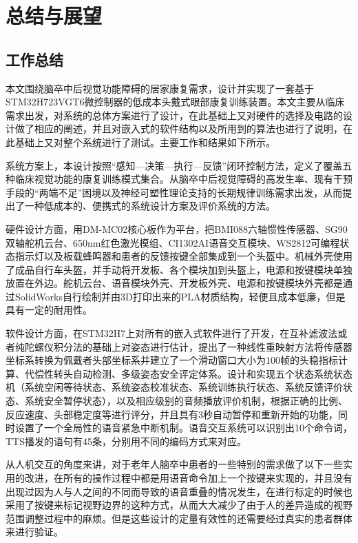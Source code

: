\chapter{总结与展望}

\section{工作总结}

本文围绕脑卒中后视觉功能障碍的居家康复需求，设计并实现了一套基于STM32H723VGT6微控制器的低成本头戴式眼部康复训练装置。本文主要从临床需求出发，对系统的总体方案进行了设计，在此基础上又对硬件的选择及电路的设计做了相应的阐述，并且对嵌入式的软件结构以及所用到的算法也进行了说明，在此基础上又对整个系统进行了测试。主要工作和结果如下所示。

系统方案上，本设计按照“感知—决策—执行—反馈”闭环控制方法，定义了覆盖五种临床视觉功能的康复训练模式集合。从脑卒中后视觉障碍的高发生率、现有干预手段的“两端不足”困境以及神经可塑性理论支持的长期规律训练需求出发，从而提出了一种低成本的、便携式的系统设计方案及评价系统的方法。

硬件设计方面，用DM-MC02核心板作为平台，把BMI088六轴惯性传感器、SG90双轴舵机云台、650nm红色激光模组、CI1302AI语音交互模块、WS2812可编程状态指示灯以及板载蜂鸣器和患者的反馈按键全部集成到一个头盔中。机械外壳使用了成品自行车头盔，并手动将开发板、各个模块加到头盔上，电源和按键模块单独放置在外边。舵机云台、语音模块外壳、开发板外壳、电源和按键模块外壳都是通过SolidWorks自行绘制并由3D打印出来的PLA材质结构，轻便且成本低廉，但是具有一定的耐用性。

软件设计方面，在STM32H7上对所有的嵌入式软件进行了开发，在互补滤波法或者纯陀螺仪积分法的基础上对姿态进行估计，提出了一种线性重映射方法将传感器坐标系转换为佩戴者头部坐标系并建立了一个滑动窗口大小为100帧的头稳指标计算、代偿性转头自动检测、多级姿态安全评定体系。设计和实现五个状态系统状态机（系统空闲等待状态、系统姿态校准状态、系统训练执行状态、系统反馈评价状态、系统安全暂停状态），以及相应级别的音频播放评价机制，根据正确的比例、反应速度、头部稳定度等进行评分，并且具有3秒自动暂停和重新开始的功能，同时设置了一个全局性的语音紧急中断机制。语音交互系统可以识别出10个命令词，TTS播发的语句有45条，分别用不同的编码方式来对应。

从人机交互的角度来讲，对于老年人脑卒中患者的一些特别的需求做了以下一些实用的改进，在所有的操作过程中都是用语音命令加上一个按键来实现的，并且没有出现过因为人与人之间的不同而导致的语音重叠的情况发生，在进行标定的时候也采用了按键来标记视野边界的这种方式，从而大大减少了由于人的差异造成的视野范围调整过程中的麻烦。但是这些设计的定量有效性的还需要经过真实的患者群体来进行验证。

